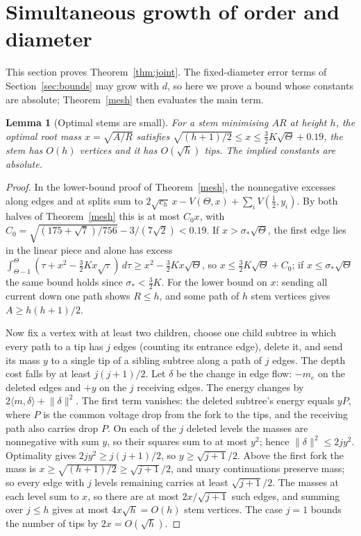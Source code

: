 \documentclass[11pt,a4paper]{article}
\newtheorem{lemma}[theorem]{Lemma}
\theoremstyle{remark}
\newcommand{\norm}[1]{\lVert #1\rVert}
\begin{document}
\section{Simultaneous growth of order and diameter}\label{sec:joint}
This section proves Theorem~\ref{thm:joint}. The fixed-diameter error terms of Section~\ref{sec:bounds} may grow with $d$, so here we prove a bound whose constants are absolute; Theorem~\ref{mesh} then evaluates the main term.

\begin{lemma}[Optimal stems are small]\label{opt-size}
For a stem minimising $AR$ at height $h$, the optimal root mass $x=\sqrt{A/R}$ satisfies $\sqrt{(h+1)/2}\le x\le\frac32K\sqrt\Theta+0.19$, the stem has $O(h)$ vertices and it has $O(\sqrt h)$ tips. The implied constants are absolute.
\end{lemma}
\begin{proof}
In the lower-bound proof of Theorem~\ref{mesh}, the nonnegative excesses along edges and at splits sum to $2\sqrt{c_h}\,x-V(\Theta,x)+\sum_iV(\frac12,y_i)$. By both halves of Theorem~\ref{mesh} this is at most $C_0x$, with $C_0=\sqrt{(175+\sqrt7)/756}-3/(7\sqrt2)<0.19$. If $x>\sigma_*\sqrt\Theta$, the first edge lies in the linear piece and alone has excess $\int_{\Theta-1}^{\Theta}(\tau+x^2-\frac32Kx\sqrt\tau)\,d\tau\ge x^2-\frac32Kx\sqrt\Theta$, so $x\le\frac32K\sqrt\Theta+C_0$; if $x\le\sigma_*\sqrt\Theta$ the same bound holds since $\sigma_*<\frac32K$. For the lower bound on $x$: sending all current down one path shows $R\le h$, and some path of $h$ stem vertices gives $A\ge h(h+1)/2$.

Now fix a vertex with at least two children, choose one child subtree in which every path to a tip has $j$ edges (counting its entrance edge), delete it, and send its mass $y$ to a single tip of a sibling subtree along a path of $j$ edges. The depth cost falls by at least $j(j+1)/2$. Let $\delta$ be the change in edge flow: $-m_e$ on the deleted edges and $+y$ on the $j$ receiving edges. The energy changes by $2\langle m,\delta\rangle+\norm\delta^2$. The first term vanishes: the deleted subtree's energy equals $yP$, where $P$ is the common voltage drop from the fork to the tips, and the receiving path also carries drop $P$. On each of the $j$ deleted levels the masses are nonnegative with sum $y$, so their squares sum to at most $y^2$; hence $\norm\delta^2\le2jy^2$. Optimality gives $2jy^2\ge j(j+1)/2$, so $y\ge\sqrt{j+1}/2$. Above the first fork the mass is $x\ge\sqrt{(h+1)/2}\ge\sqrt{j+1}/2$, and unary continuations preserve mass; so every edge with $j$ levels remaining carries at least $\sqrt{j+1}/2$. The masses at each level sum to $x$, so there are at most $2x/\sqrt{j+1}$ such edges, and summing over $j\le h$ gives at most $4x\sqrt h=O(h)$ stem vertices. The case $j=1$ bounds the number of tips by $2x=O(\sqrt h)$.
\end{proof}
\end{document}
